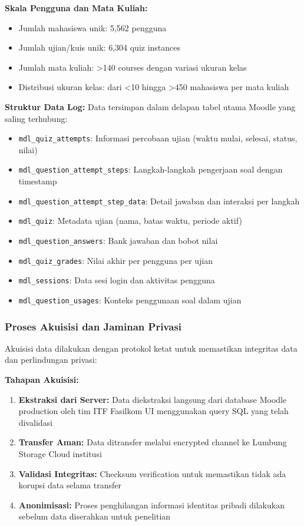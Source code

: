 \textbf{Skala Pengguna dan Mata Kuliah:}
\begin{itemize}
    \item Jumlah mahasiswa unik: 5,562 pengguna
    \item Jumlah ujian/kuis unik: 6,304 quiz instances
    \item Jumlah mata kuliah: >140 courses dengan variasi ukuran kelas
    \item Distribusi ukuran kelas: dari <10 hingga >450 mahasiswa per mata kuliah
\end{itemize}

\textbf{Struktur Data Log:}
Data tersimpan dalam delapan tabel utama Moodle yang saling terhubung:
\begin{itemize}
    \item \texttt{mdl\_quiz\_attempts}: Informasi percobaan ujian (waktu mulai, selesai, status, nilai)
    \item \texttt{mdl\_question\_attempt\_steps}: Langkah-langkah pengerjaan soal dengan timestamp
    \item \texttt{mdl\_question\_attempt\_step\_data}: Detail jawaban dan interaksi per langkah
    \item \texttt{mdl\_quiz}: Metadata ujian (nama, batas waktu, periode aktif)
    \item \texttt{mdl\_question\_answers}: Bank jawaban dan bobot nilai
    \item \texttt{mdl\_quiz\_grades}: Nilai akhir per pengguna per ujian
    \item \texttt{mdl\_sessions}: Data sesi login dan aktivitas pengguna
    \item \texttt{mdl\_question\_usages}: Konteks penggunaan soal dalam ujian
\end{itemize}

\subsubsection{Proses Akuisisi dan Jaminan Privasi}
\label{sec:prosesAkuisisiPrivasi}

Akuisisi data dilakukan dengan protokol ketat untuk memastikan integritas data dan perlindungan privasi:

\textbf{Tahapan Akuisisi:}
\begin{enumerate}
    \item \textbf{Ekstraksi dari Server:} Data diekstraksi langsung dari database Moodle production oleh tim ITF Fasilkom UI menggunakan query SQL yang telah divalidasi
    \item \textbf{Transfer Aman:} Data ditransfer melalui encrypted channel ke Lumbung Storage Cloud institusi
    \item \textbf{Validasi Integritas:} Checksum verification untuk memastikan tidak ada korupsi data selama transfer
    \item \textbf{Anonimisasi:} Proses penghilangan informasi identitas pribadi dilakukan sebelum data diserahkan untuk penelitian
\end{enumerate}

